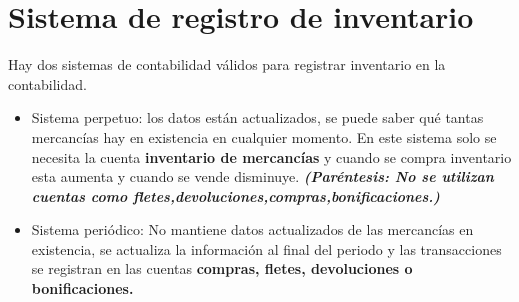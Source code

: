 \documentclass{article}
\begin{document}
\section{Sistema de registro de inventario}
Hay dos sistemas de contabilidad válidos para registrar inventario en la contabilidad.
\begin{itemize}
    \item Sistema perpetuo: los datos están actualizados, se puede saber qué tantas mercancías hay en existencia en cualquier momento. En este sistema solo se necesita la cuenta \textbf{inventario de mercancías} y cuando se compra inventario esta aumenta y cuando se vende disminuye. \emph{\textbf{(Paréntesis: No se utilizan cuentas como fletes,devoluciones,compras,bonificaciones.}\textbf{)}}
    \item Sistema periódico: No mantiene datos actualizados de las mercancías en existencia, se actualiza la información al final del periodo y las transacciones se registran en las cuentas \textbf{compras, fletes, devoluciones o bonificaciones.}
\end{itemize}
\end{document}
